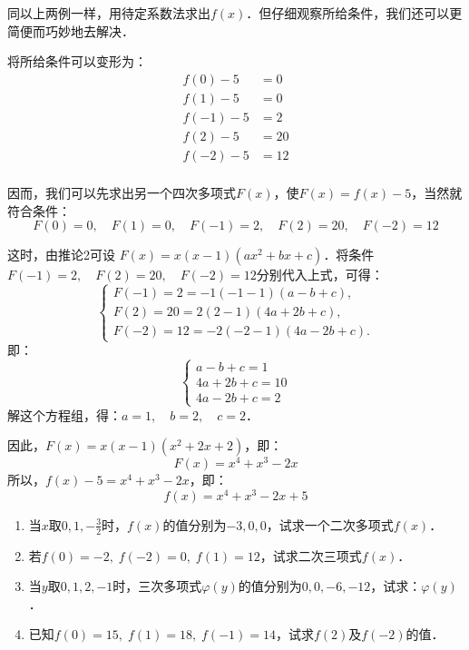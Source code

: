 \begin{note}
同以上两例一样，用待定系数法求出$f(x)$．但仔细观察所给条件，我们还可以更简便而巧妙地去解决．
\end{note}

\begin{solution}
    将所给条件可以变形为：  
\[\begin{split}
    f(0)-5&=0\\
    f(1)-5&=0\\
    f(-1)-5&=2\\
    f(2)-5&=20\\
    f(-2)-5&=12\\
\end{split}\]

因而，我们可以先求出另一个四次多项式$F(x)$，使$F(x)=f(x)-5$，当然就符合条件：
\[F(0)=0,\quad F (1) =0,\quad  F (-1) =2,\quad F (2) =20,\quad  F (-2) =12\]

这时，由推论2可设
$F (x) =x (x-1) (ax^2+bx+c)$．将条件$F(-1)=2,\quad F(2)=20,\quad F(-2)=12$分别代入上式，可得：
\[\begin{cases}
    F (-1) =2=-1 (-1-1) (a-b+c),\\
    F (2) =20=2 (2-1) (4a+2b+c),\\
    F (-2) =12=-2 (-2-1) (4a-2b+c). 
\end{cases}\]
即：\[\begin{cases}
    a-b+c=1\\
4a+2b+c=10\\
4a-2b+c=2
\end{cases}\]
解这个方程组，得：$a=1,\quad b=2,\quad c=2$．

因此，$F(x)=x(x-1)(x^2+2x+2)$，即：
\[F(x)=x^4+x^3-2x\]
所以，$f(x)-5=x^4+x^3-2x$，即：
\[f(x)=x^4+x^3-2x+5\]
\end{solution}

\begin{ex}
\begin{enumerate}
    \item 当$x$取$0,1,-\frac{3}{2}$时，$f(x)$的值分别为$-3,0,0$，试求一个二次多项式$f(x)$．
\item 若$f(0)=-2,\; f(-2)=0,\; f(1)=12$，试求二次三项式$f(x)$．
\item 当$y$取$0, 1, 2,-1$时，三次多项式$\varphi(y)$的值分别为$0, 0,-6,-12$，试求：$\varphi(y)$．
\item 已知$f(0)=15,\; f(1)=18,\; f(-1)=14$，试求$f(2)$及$f(-2)$的值．
\end{enumerate}
\end{ex}

